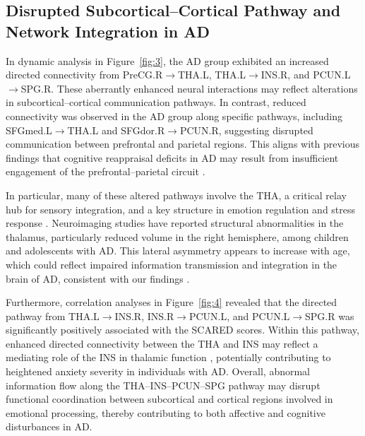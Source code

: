 \documentclass[lettersize,journal]{IEEEtran}
\begin{document}
\subsection{Disrupted Subcortical–Cortical Pathway and Network Integration in AD}

In dynamic analysis in Figure~\ref{fig:3}, the AD group exhibited an increased directed connectivity from PreCG.R$\rightarrow$THA.L, THA.L$\rightarrow$INS.R, and PCUN.L$\rightarrow$SPG.R. These aberrantly enhanced neural interactions may reflect alterations in subcortical–cortical communication pathways.  
In contrast, reduced connectivity was observed in the AD group along specific pathways, including SFGmed.L$\rightarrow$THA.L and SFGdor.R$\rightarrow$PCUN.R, suggesting disrupted communication between prefrontal and parietal regions. 
This aligns with previous findings that cognitive reappraisal deficits in AD may result from insufficient engagement of the prefrontal–parietal circuit  \cite{wang2018prefrontoparietal}.

In particular, many of these altered pathways involve the THA, a critical relay hub for sensory integration, and a key structure in emotion regulation and stress response   \cite{kirouac2021paraventricular}. Neuroimaging studies have reported structural abnormalities in the thalamus, particularly reduced volume in the right hemisphere, among children and adolescents with AD. This lateral asymmetry appears to increase with age, which could reflect impaired information transmission and integration in the brain of AD, consistent with our findings   \cite{zhang2020abnormal}.

Furthermore, correlation analyses in Figure~\ref{fig:4} revealed that the directed pathway from THA.L$\rightarrow$INS.R, INS.R$\rightarrow$PCUN.L, and PCUN.L$\rightarrow$SPG.R was significantly positively associated with the SCARED scores. Within this pathway, enhanced directed connectivity between the THA and INS may reflect a mediating role of the INS in thalamic function   \cite{terasawa2013anterior}, potentially contributing to heightened anxiety severity in individuals with AD.  
Overall, abnormal information flow along the THA–INS–PCUN–SPG pathway may disrupt functional coordination between subcortical and cortical regions involved in emotional processing, thereby contributing to both affective and cognitive disturbances in AD.
\end{document}
